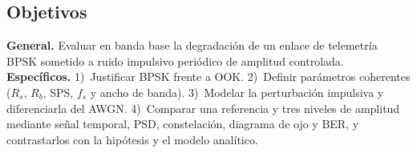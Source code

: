 \subsection{Objetivos}\label{subsec:objetivos}

\textbf{General.} Evaluar en banda base la degradación de un enlace de
telemetría BPSK sometido a ruido impulsivo periódico de amplitud controlada.
\textbf{Específicos.} 1)~Justificar BPSK frente a OOK. 2)~Definir parámetros
coherentes ($R_s$, $R_b$, SPS, $f_s$ y ancho de banda). 3)~Modelar la
perturbación impulsiva y diferenciarla del AWGN. 4)~Comparar una referencia y
tres niveles de amplitud mediante señal temporal, PSD, constelación, diagrama
de ojo y BER, y contrastarlos con la hipótesis y el modelo analítico.

